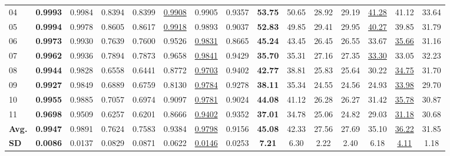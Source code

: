 \documentclass[pdflatex,iicol,sn-mathphys-num]{sn-jnl}
\begin{document}
\begin{table}[!t]
{\begin{tabular}{lccccccc|ccccccc}
  04
  & \textbf{0.9993} & 0.9984 & 0.8394 & 0.8399 & \underline{0.9908} & 0.9905 & 0.9357
  & \textbf{53.75} & 50.65 & 28.92 & 29.19 & \underline{41.28} & 41.12 & 33.64 \\

  05
  & \textbf{0.9994} & 0.9978 & 0.8605 & 0.8617 & \underline{0.9918} & 0.9893 & 0.9037
  & \textbf{52.83} & 49.85 & 29.41 & 29.95 & \underline{40.27} & 39.85 & 31.79 \\

  06
  & \textbf{0.9973} & 0.9930 & 0.7639 & 0.7600 & 0.9526 & \underline{0.9831} & 0.8665
  & \textbf{45.24} & 43.45 & 26.45 & 26.55 & 33.67 & \underline{35.66} & 31.16 \\

  07
  & \textbf{0.9962} & 0.9936 & 0.7894 & 0.7873 & 0.9658 & \underline{0.9841} & 0.9429
  & \textbf{35.70} & 35.31 & 27.16 & 27.35 & \underline{33.30} & 33.05 & 32.23 \\

  08
  & \textbf{0.9944} & 0.9828 & 0.6558 & 0.6441 & 0.8772 & \underline{0.9703} & 0.9402
  & \textbf{42.77} & 38.81 & 25.83 & 25.64 & 30.22 & \underline{34.75} & 31.70 \\

  09
  & \textbf{0.9927} & 0.9849 & 0.6889 & 0.6759 & 0.8130 & \underline{0.9784} & 0.9278
  & \textbf{38.11} & 35.34 & 24.55 & 24.56 & 24.93 & \underline{33.98} & 29.70 \\

  10
  & \textbf{0.9955} & 0.9885 & 0.7057 & 0.6974 & 0.9097 & \underline{0.9781} & 0.9024
  & \textbf{44.08} & 41.12 & 26.28 & 26.27 & 31.42 & \underline{35.78} & 30.87 \\

  11
  & \textbf{0.9698} & 0.9509 & 0.6257 & 0.6201 & 0.8666 & \underline{0.9402} & 0.9352
  & \textbf{37.01} & 34.78 & 25.06 & 24.82 & 29.03 & \underline{31.18} & 30.68 \\

  \midrule

  \textbf{Avg.}
  & \textbf{0.9947} & 0.9891 & 0.7624 & 0.7583 & 0.9384 & \underline{0.9798} & 0.9156
  & \textbf{45.08} & 42.33 & 27.56 & 27.69 & 35.10 & \underline{36.22} & 31.85 \\

  \textbf{SD}
  & \textbf{0.0086} & 0.0137 & 0.0829 & 0.0871 & 0.0622 & \underline{0.0146} & 0.0253
  & \textbf{7.21} & 6.30 & 2.22 & 2.40 & 6.18 & \underline{4.11} & 1.18 \\


\end{tabular}}
\end{table}
\end{document}
